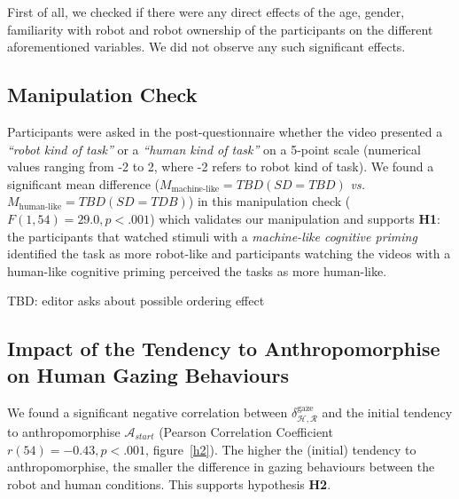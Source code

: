 \documentclass[lettersize, noapacite, twoside, HRI]{apa_HRI}
\newcommand{\ie}{\textit{i.e.}\xspace}
\newcommand{\vs}{\textit{vs.}\xspace}
\newcommand{\h}[1]{\textbf{H#1}\xspace}
\newcommand{\anti}{{$\mathcal{A}_{start}$\xspace}}
\begin{document}
First of all, we checked if there were any direct effects of the age, gender,
familiarity with robot and robot ownership of the participants on the different
aforementioned variables. We did not observe any such significant effects. 



\subsection{Manipulation Check}



Participants were asked in the post-questionnaire whether the video presented a
\emph{``robot kind of task''} or a \emph{``human kind of task''} on a 5-point
scale (numerical values ranging from -2 to 2, where -2 refers to robot kind of
task). We found a significant mean difference ($M_{\text{machine-like}}=TBD (SD=TBD)$
\vs $M_{\text{human-like}}=TBD (SD=TDB)$) in this
manipulation check ($F(1,54) = 29.0, p < .001$) which validates our manipulation
and supports \h{1}: the participants that watched stimuli with a \emph{machine-like cognitive
priming} identified the task as more robot-like and participants watching
the videos with a human-like cognitive priming perceived the tasks as more human-like.

TBD: editor asks about possible ordering effect

\subsection{Impact of the Tendency to Anthropomorphise on Human
Gazing Behaviours}

We found a significant negative correlation between
$\delta_{\mathcal{H},\mathcal{R}}^{\text{gaze}}$ and
the initial tendency to anthropomorphise \anti{} (Pearson Correlation Coefficient $r(54) = -0.43,
p < .001$, figure~\ref{h2}). The higher the (initial) tendency to anthropomorphise, the smaller
the difference in gazing behaviours between the robot and human conditions. This
supports hypothesis \h{2}.
\end{document}
